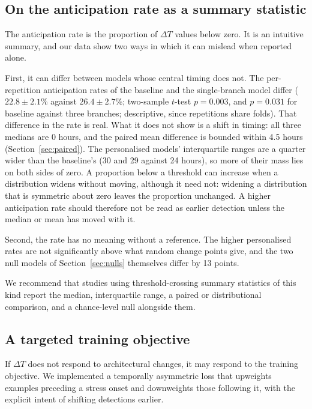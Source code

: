 \documentclass[preprint,12pt,authoryear]{elsarticle}
\newcommand{\dt}{$\Delta T$}
\begin{document}
\subsection{On the anticipation rate as a summary statistic}
\label{sec:antrate}

The anticipation rate is the proportion of \dt{} values below zero. It
is an intuitive summary, and our data show two ways in which it can
mislead when reported alone.

First, it can differ between models whose central timing does not. The
per-repetition anticipation rates of the baseline and the
single-branch model differ ($22.8 \pm 2.1$\% against
$26.4 \pm 2.7$\%; two-sample $t$-test $p = 0.003$, and $p = 0.031$ for
baseline against three branches; descriptive, since repetitions share
folds). That difference in the rate is real. What it does not show is
a shift in timing: all three medians are 0 hours, and the paired mean
difference is bounded within 4.5 hours (Section~\ref{sec:paired}). The
personalised models' interquartile ranges are a quarter wider than the
baseline's (30 and 29 against 24 hours), so more of their mass lies on
both sides of zero. A proportion below a threshold can increase when a
distribution widens without moving, although it need not: widening a
distribution that is symmetric about zero leaves the proportion
unchanged. A higher anticipation rate should therefore not be read as
earlier detection unless the median or mean has moved with it.

Second, the rate has no meaning without a reference. The higher
personalised rates are not significantly above what random change
points give, and the two null models of Section~\ref{sec:nulls}
themselves differ by 13 points.

We recommend that studies using threshold-crossing summary statistics
of this kind report the median, interquartile range, a paired or
distributional comparison, and a chance-level null alongside them.

\subsection{A targeted training objective}

If \dt{} does not respond to architectural changes, it may respond to
the training objective. We implemented a temporally asymmetric loss that
upweights examples preceding a stress onset and downweights those
following it, with the explicit intent of shifting detections earlier.
\end{document}

